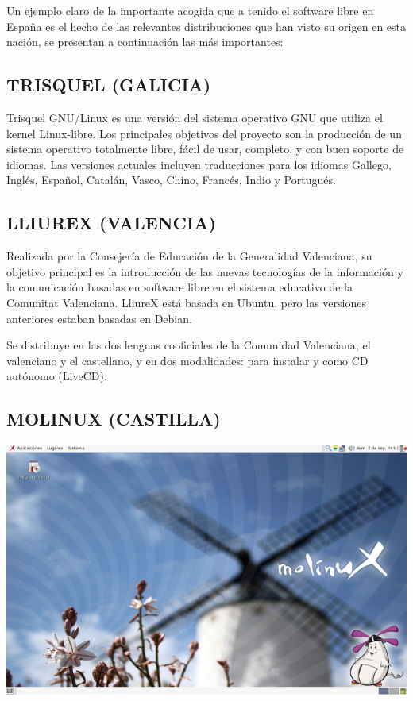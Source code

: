 Un ejemplo claro de la importante acogida que a tenido el software libre en España es el hecho de las relevantes distribuciones que han visto su origen en esta nación, se 
presentan a continuación las más importantes:

\subsection*{TRISQUEL (GALICIA)}
Trisquel GNU/Linux es una versión del sistema operativo GNU que utiliza el kernel Linux-libre. Los principales objetivos del proyecto son la producción de un sistema operativo 
totalmente libre, fácil de usar, completo, y con buen soporte de idiomas. Las versiones actuales incluyen traducciones para los idiomas Gallego, Inglés, Español, Catalán, Vasco, 
Chino, Francés, Indio y Portugués.

\subsection*{LLIUREX (VALENCIA)}
Realizada por la Consejería de Educación de la Generalidad Valenciana, su objetivo principal es la introducción de las nuevas tecnologías de la información y la comunicación 
basadas en software libre en el sistema educativo de la Comunitat Valenciana. LliureX está basada en Ubuntu, pero las versiones anteriores estaban basadas en Debian.

Se distribuye en las dos lenguas cooficiales de la Comunidad Valenciana, el valenciano y el castellano, y en dos modalidades: para instalar y como CD autónomo (LiveCD).

\subsection*{MOLINUX (CASTILLA)}

\includegraphics[scale=0.3]{img/cp03/img0303.png}

